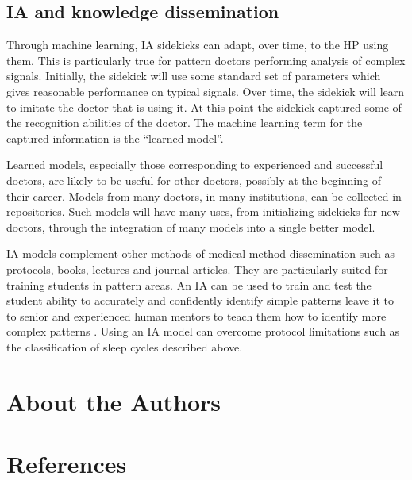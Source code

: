 \documentclass[11pt]{pnas-new}
\begin{document}
\subsection{IA and knowledge dissemination}

Through machine learning, IA sidekicks can adapt, over time, to the
HP using them. This is particularly true for pattern doctors
performing analysis of complex signals. Initially, the sidekick will
use some standard set of parameters which gives reasonable performance on
typical signals. Over time, the sidekick will learn to imitate the
doctor that is using it. At this point the sidekick captured some of
the recognition abilities of the doctor. The machine learning term for
the captured information is the ``learned model''.

Learned models, especially those corresponding to experienced and
successful doctors, are likely to be useful for other doctors,
possibly at the beginning of their career. Models from many doctors,
in many institutions, can be collected in repositories. Such models
will have many uses, from initializing sidekicks for new doctors,
through the integration of many models into a single better model.

IA models complement other methods of medical method dissemination
such as protocols, books, lectures and journal articles. They are
particularly suited for training students in pattern areas. An IA can
be used to train and test the student ability to accurately and
confidently identify simple patterns leave it to to senior and
experienced human mentors to teach them how to identify more complex
patterns \cite{reid2000medical}.
Using an IA model can overcome protocol limitations such as
the classification of sleep cycles described above.

\section{About the Authors}


\section{References}
%  

\end{document}

